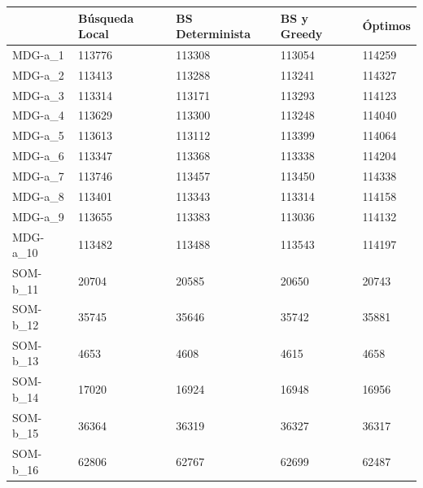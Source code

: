 \documentclass[11pt,a4paper]{article}
\begin{document}
	\begin{table}[H]
		\begin{tabular}{l|l|l|l|l|}
			\cline{2-5}
			& Búsqueda Local & BS Determinista & BS y Greedy & Óptimos     \\ \hline
			\multicolumn{1}{|l|}{MDG-a\_1}  & 113776         & 113308          & 113054      & 114259      \\ \hline
			\multicolumn{1}{|l|}{MDG-a\_2}  & 113413         & 113288          & 113241      & 114327      \\ \hline
			\multicolumn{1}{|l|}{MDG-a\_3}  & 113314         & 113171          & 113293      & 114123      \\ \hline
			\multicolumn{1}{|l|}{MDG-a\_4}  & 113629         & 113300          & 113248      & 114040      \\ \hline
			\multicolumn{1}{|l|}{MDG-a\_5}  & 113613         & 113112          & 113399      & 114064      \\ \hline
			\multicolumn{1}{|l|}{MDG-a\_6}  & 113347         & 113368          & 113338      & 114204      \\ \hline
			\multicolumn{1}{|l|}{MDG-a\_7}  & 113746         & 113457          & 113450      & 114338      \\ \hline
			\multicolumn{1}{|l|}{MDG-a\_8}  & 113401         & 113343          & 113314      & 114158      \\ \hline
			\multicolumn{1}{|l|}{MDG-a\_9}  & 113655         & 113383          & 113036      & 114132      \\ \hline
			\multicolumn{1}{|l|}{MDG-a\_10} & 113482         & 113488          & 113543      & 114197      \\ \hline
			\multicolumn{1}{|l|}{SOM-b\_11} & 20704          & 20585           & 20650       & 20743       \\ \hline
			\multicolumn{1}{|l|}{SOM-b\_12} & 35745          & 35646           & 35742       & 35881       \\ \hline
			\multicolumn{1}{|l|}{SOM-b\_13} & 4653           & 4608            & 4615        & 4658        \\ \hline
			\multicolumn{1}{|l|}{SOM-b\_14} & 17020          & 16924           & 16948       & 16956       \\ \hline
			\multicolumn{1}{|l|}{SOM-b\_15} & 36364          & 36319           & 36327       & 36317       \\ \hline
			\multicolumn{1}{|l|}{SOM-b\_16} & 62806          & 62767           & 62699       & 62487       \\ \hline

\end{tabular}
\end{table}
\end{document}
